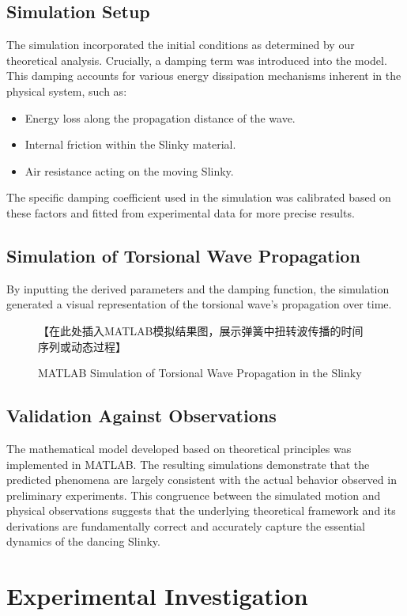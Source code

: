 \documentclass{mcmthesis}  %
\begin{document}
\subsection{Simulation Setup}
The simulation incorporated the initial conditions as determined by our theoretical analysis. Crucially, a damping term was introduced into the model. This damping accounts for various energy dissipation mechanisms inherent in the physical system, such as:
\begin{itemize}
    \item Energy loss along the propagation distance of the wave.
    \item Internal friction within the Slinky material.
    \item Air resistance acting on the moving Slinky.
\end{itemize}
The specific damping coefficient used in the simulation was calibrated based on these factors and fitted from experimental data for more precise results.

\subsection{Simulation of Torsional Wave Propagation}
By inputting the derived parameters and the damping function, the simulation generated a visual representation of the torsional wave's propagation over time.

\begin{figure}[h!]
    \centering
    【在此处插入MATLAB模拟结果图，展示弹簧中扭转波传播的时间序列或动态过程】
    \caption{MATLAB Simulation of Torsional Wave Propagation in the Slinky}
    \label{fig:matlab_simulation}
\end{figure}

\subsection{Validation Against Observations}
The mathematical model developed based on theoretical principles was implemented in MATLAB. The resulting simulations demonstrate that the predicted phenomena are largely consistent with the actual behavior observed in preliminary experiments. This congruence between the simulated motion and physical observations suggests that the underlying theoretical framework and its derivations are fundamentally correct and accurately capture the essential dynamics of the dancing Slinky.

\section{Experimental Investigation}
\end{document}
